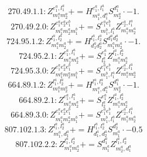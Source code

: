 \documentclass[letterpaper,10pt,fleqn,leqno,onecolumn]{article}
\begin{document}
\begin{equation} \;\;\;\;\;\;  270.49.1.1: Z^{e_{1}^{a},l_{1}^{a}}_{m_{1}^{a}m_{2}^{a}}+=H^{e_{1}^{a},l_{1}^{a}}_{m_{1}^{a},d_{1}^{a}}S^{d_{1}^{a}}_{m_{2}^{a}}\cdot -1. \end{equation}
\begin{equation} \;\;\;\;\;\;  270.49.2.0: Z^{e_{1}^{a}e_{2}^{a}e_{1}^{b}}_{m_{1}^{a}m_{2}^{a}m_{1}^{b}}+=S^{e_{1}^{a}e_{1}^{b}}_{m_{1}^{b},l_{1}^{a}}Z^{e_{2}^{a},l_{1}^{a}}_{m_{1}^{a}m_{2}^{a}} \end{equation}
\begin{equation} \;\;\;\;\;\;  724.95.1.2: Z^{l_{1}^{a},l_{2}^{a}}_{m_{1}^{a}m_{2}^{a}}+=H^{l_{1}^{a},l_{2}^{a}}_{d_{1}^{a}d_{2}^{a}}S^{d_{1}^{a}d_{2}^{a}}_{m_{1}^{a}m_{2}^{a}}\cdot -1. \end{equation}
\begin{equation} \;\;\;\;\;\;  724.95.2.1: Z^{e_{1}^{a},l_{1}^{a}}_{m_{1}^{a}m_{2}^{a}}+=S^{e_{1}^{a}}_{l_{2}^{a}}Z^{l_{1}^{a},l_{2}^{a}}_{m_{1}^{a}m_{2}^{a}} \end{equation}
\begin{equation} \;\;\;\;\;\;  724.95.3.0: Z^{e_{1}^{a}e_{2}^{a}e_{1}^{b}}_{m_{1}^{a}m_{2}^{a}m_{1}^{b}}+=S^{e_{1}^{a}e_{1}^{b}}_{m_{1}^{b},l_{1}^{a}}Z^{e_{2}^{a},l_{1}^{a}}_{m_{1}^{a}m_{2}^{a}} \end{equation}
\begin{equation} \;\;\;\;\;\;  664.89.1.2: Z^{l_{1}^{a},l_{2}^{a}}_{m_{1}^{a}m_{2}^{a}}+=H^{l_{1}^{a},l_{2}^{a}}_{m_{1}^{a},d_{1}^{a}}S^{d_{1}^{a}}_{m_{2}^{a}}\cdot -1. \end{equation}
\begin{equation} \;\;\;\;\;\;  664.89.2.1: Z^{e_{1}^{a},l_{1}^{a}}_{m_{1}^{a}m_{2}^{a}}+=S^{e_{1}^{a}}_{l_{2}^{a}}Z^{l_{1}^{a},l_{2}^{a}}_{m_{1}^{a}m_{2}^{a}} \end{equation}
\begin{equation} \;\;\;\;\;\;  664.89.3.0: Z^{e_{1}^{a}e_{2}^{a}e_{1}^{b}}_{m_{1}^{a}m_{2}^{a}m_{1}^{b}}+=S^{e_{1}^{a}e_{1}^{b}}_{m_{1}^{b},l_{1}^{a}}Z^{e_{2}^{a},l_{1}^{a}}_{m_{1}^{a}m_{2}^{a}} \end{equation}
\begin{equation} \;\;\;\;\;\;  807.102.1.3: Z^{l_{1}^{a},l_{2}^{a}}_{m_{1}^{a},d_{1}^{a}}+=H^{l_{1}^{a},l_{2}^{a}}_{d_{1}^{a},d_{2}^{a}}S^{d_{2}^{a}}_{m_{1}^{a}}\cdot -0.5 \end{equation}
\begin{equation} \;\;\;\;\;\;  807.102.2.2: Z^{l_{1}^{a},l_{2}^{a}}_{m_{1}^{a}m_{2}^{a}}+=S^{d_{1}^{a}}_{m_{1}^{a}}Z^{l_{1}^{a},l_{2}^{a}}_{m_{2}^{a},d_{1}^{a}} \end{equation}
\end{document}
